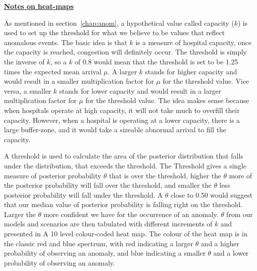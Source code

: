 \underline{\textbf{Notes on heat-maps}}

\newpara

As mentioned in section~\ref{chap:anom}, a hypothetical value called capacity ($k$) is used to set up the threshold for what we believe to be values that reflect anomalous events. The basic idea is that $k$ is a measure of hospital capacity, once the capacity is reached, congestion will definitely occur. The threshold is simply the inverse of $k$, so a $k$ of 0.8 would mean that the threshold is set to be 1.25 times the expected mean arrival $\mu$. A larger $k$ stands for higher capacity and would result in a smaller multiplication factor for $\mu$ for the threshold value. Vice versa, a smaller $k$ stands for lower capacity and would result in a larger multiplication factor for $\mu$ for the threshold value. The idea makes sense because when hospitals operate at high capacity, it will not take much to overfill their capacity. However, when a hospital is operating at a lower capacity, there is a large buffer-zone, and it would take a sizeable abnormal arrival to fill the capacity.

\newpara

A threshold is used to calculate the area of the posterior distribution that falls under the distribution, that exceeds the threshold. The Threshold gives a single measure of posterior probability $\theta$ that is over the threshold, higher the $\theta$ more of the posterior probability will fall over the threshold, and smaller the $\theta$ less posterior probability will fall under the threshold. A $\theta$ close to 0.50 would suggest that our median value of posterior probability is falling right on the threshold. Larger the $\theta$ more confident we have for the occurrence of an anomaly. $\theta$ from our models and scenarios are then tabulated with different increments of $k$ and presented in A 10 level colour-coded heat map. The colour of the heat map is in the classic red and blue spectrum, with red indicating a larger $\theta$ and a higher probability of observing an anomaly, and blue indicating a smaller $\theta$ and a lower probability of observing an anomaly. 

\newpage

